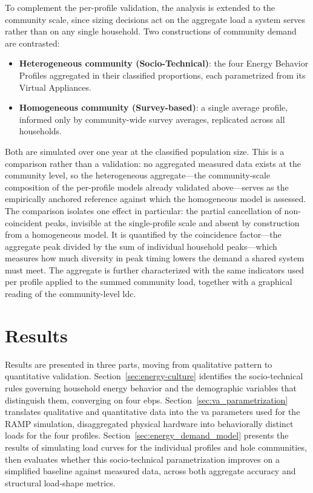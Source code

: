 \documentclass[final,3p,times,onecolumn]{elsarticle}
\begin{document}
To complement the per-profile validation, the analysis is extended to the community scale, since sizing decisions act on the aggregate load a system serves rather than on any single household. Two constructions of community demand are contrasted:

\begin{itemize}
\item \textbf{Heterogeneous community (Socio-Technical)}: the four Energy Behavior Profiles aggregated in their classified proportions, each parametrized from its Virtual Appliances.
\item \textbf{Homogeneous community (Survey-based)}: a single average profile, informed only by community-wide survey averages, replicated across all households.
\end{itemize}

Both are simulated over one year at the classified population size. This is a comparison rather than a validation: no aggregated measured data exists at the community level, so the heterogeneous aggregate---the community-scale composition of the per-profile models already validated above---serves as the empirically anchored reference against which the homogeneous model is assessed. The comparison isolates one effect in particular: the partial cancellation of non-coincident peaks, invisible at the single-profile scale and absent by construction from a homogeneous model. It is quantified by the coincidence factor---the aggregate peak divided by the sum of individual household peaks---which measures how much diversity in peak timing lowers the demand a shared system must meet. The aggregate is further characterized with the same indicators used per profile applied to the summed community load, together with a graphical reading of the community-level \gls{ldc}.

\section{Results}
\label{sec:results}

Results are presented in three parts, moving from qualitative pattern to quantitative validation. Section~\ref{sec:energy-culture} identifies the socio-technical rules governing household energy behavior and the demographic variables that distinguish them, converging on four \glspl{ebp}. Section~\ref{sec:va_parametrization} translates qualitative and quantitative data into the \gls{va} parameters used for the RAMP simulation, disaggregated physical hardware into behaviorally distinct loads for the four profiles. Section~\ref{sec:energy_demand_model} presents the results of simulating load curves for the individual profiles and hole communities, then evaluates whether this socio-technical parametrization improves on a simplified baseline against measured data, across both aggregate accuracy and structural load-shape metrics.
\end{document}
